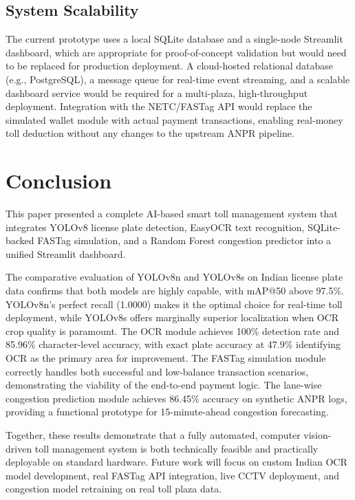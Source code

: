 \documentclass[conference]{IEEEtran}
\begin{document}
\subsection{System Scalability}

The current prototype uses a local SQLite database and a single-node
Streamlit dashboard, which are appropriate for proof-of-concept
validation but would need to be replaced for production deployment.
A cloud-hosted relational database (e.g., PostgreSQL), a message
queue for real-time event streaming, and a scalable dashboard
service would be required for a multi-plaza, high-throughput
deployment.
Integration with the NETC/FASTag API would replace the simulated
wallet module with actual payment transactions, enabling
real-money toll deduction without any changes to the upstream
ANPR pipeline.

\section{Conclusion}

This paper presented a complete AI-based smart toll management
system that integrates YOLOv8 license plate detection, EasyOCR
text recognition, SQLite-backed FASTag simulation, and a Random
Forest congestion predictor into a unified Streamlit dashboard.

The comparative evaluation of YOLOv8n and YOLOv8s on Indian
license plate data confirms that both models are highly capable,
with mAP@50 above 97.5\%.
YOLOv8n's perfect recall (1.0000) makes it the optimal choice
for real-time toll deployment, while YOLOv8s offers marginally
superior localization when OCR crop quality is paramount.
The OCR module achieves 100\% detection rate and 85.96\%
character-level accuracy, with exact plate accuracy at 47.9\%
identifying OCR as the primary area for improvement.
The FASTag simulation module correctly handles both successful and
low-balance transaction scenarios, demonstrating the viability of
the end-to-end payment logic.
The lane-wise congestion prediction module achieves 86.45\%
accuracy on synthetic ANPR logs, providing a functional prototype
for 15-minute-ahead congestion forecasting.

Together, these results demonstrate that a fully automated,
computer vision-driven toll management system is both technically
feasible and practically deployable on standard hardware.
Future work will focus on custom Indian OCR model development,
real FASTag API integration, live CCTV deployment, and congestion
model retraining on real toll plaza data.
\end{document}
